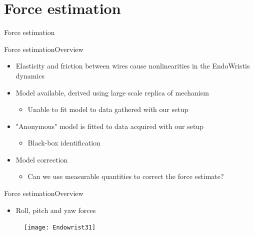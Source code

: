 \section{Force estimation}
\begin{frame}{Force estimation}
\end{frame}

\begin{frame}{Force estimation}{Overview}
\begin{itemize}
\item Elasticity and friction between wires cause nonlinearities in the EndoWristis dynamics
\item Model available, derived using large scale replica of mechanism
	\begin{itemize}
		\item Unable to fit model to data gathered with our setup
	\end{itemize}
	
\item "Anonymous" model is fitted to data acquired with our setup
	\begin{itemize}
		\item Black-box identification
	\end{itemize}

\item Model correction
	\begin{itemize}
		\item Can we use measurable quantities to correct the force estimate?
	\end{itemize}

\end{itemize}
\end{frame}

\begin{frame}{Force estimation}{Overview}
\begin{itemize}
  	\item Roll, pitch and yaw forces
\end{itemize}
 \begin{figure}[h]
 \centering
 \texttt{[image: Endowrist31]}
 \label{fig:ewr}
 \end{figure}
\end{frame}

